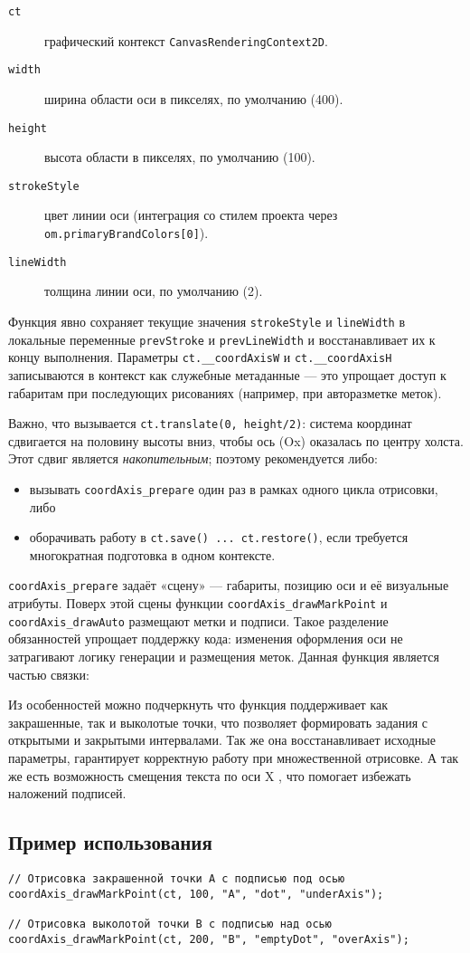  

\begin{description}
  \item[\texttt{ct}] графический контекст \verb|CanvasRenderingContext2D|.
  \item[\texttt{width}] ширина области оси в пикселях, по умолчанию (400).
  \item[\texttt{height}] высота области в пикселях, по умолчанию (100).
  \item[\texttt{strokeStyle}] цвет линии оси (интеграция со стилем проекта через \verb|om.primaryBrandColors[0]|).
  \item[\texttt{lineWidth}] толщина линии оси, по умолчанию (2).
\end{description}

Функция явно сохраняет текущие значения \verb|strokeStyle| и \verb|lineWidth| в локальные переменные
\verb|prevStroke| и \verb|prevLineWidth| и восстанавливает их к концу выполнения.  
Параметры \verb|ct.__coordAxisW| и \verb|ct.__coordAxisH| записываются в контекст как служебные метаданные — это упрощает доступ к габаритам при последующих рисованиях (например, при авторазметке меток).

Важно, что вызывается \verb|ct.translate(0, height/2)|: система координат сдвигается на половину высоты вниз, чтобы ось (Ox) оказалась по центру холста. Этот сдвиг является \emph{накопительным}; поэтому рекомендуется либо:
\begin{itemize}
  \item вызывать \verb|coordAxis_prepare| один раз в рамках одного цикла отрисовки, либо
  \item оборачивать работу в \verb|ct.save() ... ct.restore()|, если требуется многократная подготовка в одном контексте.
\end{itemize}

\verb|coordAxis_prepare| задаёт «сцену» — габариты, позицию оси и её визуальные атрибуты. Поверх этой сцены функции \verb|coordAxis_drawMarkPoint| и \verb|coordAxis_drawAuto| размещают метки и подписи.
 Такое разделение обязанностей упрощает поддержку кода: изменения оформления оси не затрагивают логику генерации и размещения меток.
Данная функция является частью связки:
    
Из особенностей можно подчеркнуть что функция поддерживает как закрашенные, так и выколотые точки, что позволяет формировать задания с открытыми и закрытыми интервалами.
Так же она восстанавливает исходные параметры, гарантирует корректную работу при множественной отрисовке. А так же есть возможность смещения текста по оси X , что помогает избежать наложений подписей.
 


\subsection{Пример использования}
\begin{verbatim}
// Отрисовка закрашенной точки A с подписью под осью
coordAxis_drawMarkPoint(ct, 100, "A", "dot", "underAxis");

// Отрисовка выколотой точки B с подписью над осью
coordAxis_drawMarkPoint(ct, 200, "B", "emptyDot", "overAxis");
\end{verbatim}
